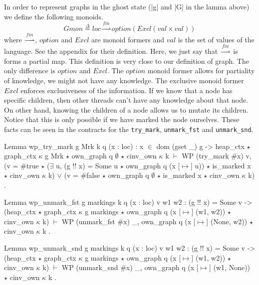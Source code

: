\documentclass[nocopyrightspace]{sigplanconf}
\def\MyMLe{\lstinline[language=MyML, basicstyle=\small\ttfamily]}
\newcommand{\defeq}{\overset{\Delta}{=}}
\newcommand{\val}{\mathit{val}}
\newcommand{\loc}{\mathit{loc}}
\newcommand{\option}{\mathit{option}}
\newcommand{\Excl}{\mathit{Excl}}
\newcommand{\finmap}{\overset{\mathit{fin}}{\rightharpoonup}}
\begin{document}
In order to represent graphs in the ghost state (\Coqe|g| and \Coqe|G| in the lamma above) we define the following monoids.
\[
\mathit{Gmon} \defeq \loc \finmap \option(\Excl(\val \times \val))
\]
where $\finmap$, $\option$ and $\Excl$ are monoid formers and $\val$ is the set of values of the language.
See the appendix for their definition.
Here, we just say that $\finmap$ is forms a partial map.
This definition is very close to our definition of graph.
The only difference is $\option$ and $\Excl$.
The $\option$ monoid former allows for partiality of knowledge,
we might not have any knowledge.
The exclusive monoid former $\Excl$ enforces exclusiveness of the
information.
If we know that a node has specific children, then other threads
can't have any knowledge about that node.
On other hand, knowing the children of a node allows us to mutate its
children. Notice that this is only possible if we have marked the node
ourselves.
These facts can be seen in the contracts for the \MyMLe{try_mark},
\MyMLe{unmark_fst} and \MyMLe{unmark_snd}.
\begin{Coq}
Lemma wp_try_mark g Mrk k q (x : loc) : x $\in$ dom (gset _) g ->
    heap_ctx $\star$ graph_ctx $\kappa$ g Mrk $\star$ own_graph q $\emptyset$ $\star$ cinv_own $\kappa$ k
    $\vdash$ WP (try_mark $\#$x) {{ v,
         (v = $\#$true $\star$ ($\exists$ u, (g !! x) = Some u $\star$ own_graph q (x [$\mapsto$] u))
          $\star$ is_marked x $\star$ cinv_own $\kappa$ k)
           $\lor$ (v = $\#$false $\star$ own_graph q $\emptyset$ $\star$ is_marked x
              $\star$ cinv_own $\kappa$ k) }}.
\end{Coq}

\begin{Coq}
Lemma wp_unmark_fst g markings k q (x : loc) v w1 w2 :
    (g !! x) = Some v ->
    (heap_ctx $\star$ graph_ctx $\kappa$ g markings
     $\star$ own_graph q (x [$\mapsto$] (w1, w2)) $\star$ cinv_own $\kappa$ k) $\vdash$
      WP (unmark_fst $\#$x)
      {{ _, own_graph q (x [$\mapsto$] (None, w2)) $\star$ cinv_own $\kappa$ k }}.
\end{Coq}

\begin{Coq}
Lemma wp_unmark_snd g markings k q (x : loc) v w1 w2 :
    (g !! x) = Some v ->
    (heap_ctx $\star$ graph_ctx $\kappa$ g markings
    $\star$ own_graph q (x [$\mapsto$] (w1, w2)) $\star$ cinv_own $\kappa$ k) $\vdash$
      WP (unmark_snd $\#$x)
      {{ _, own_graph q (x [$\mapsto$] (w1, None)) $\star$ cinv_own $\kappa$ k }}.
\end{Coq}
\end{document}
